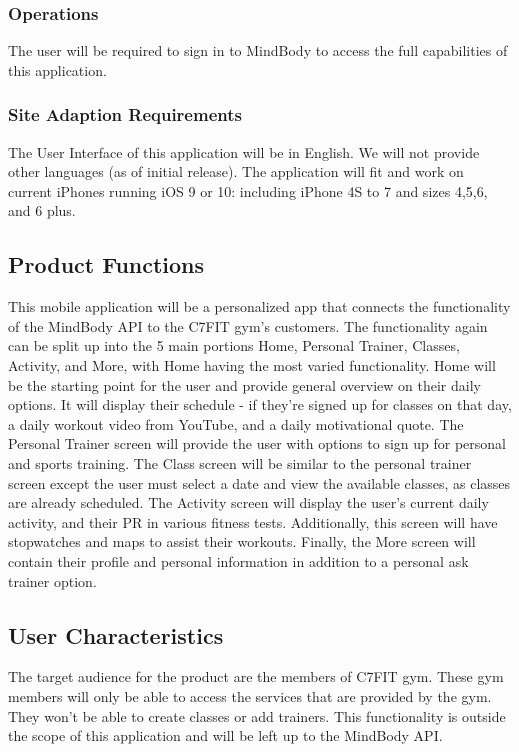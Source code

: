 \documentclass[letterpaper,10pt,titlepage]{article}
\begin{document}
\subsubsection{Operations}

The user will be required to sign in to MindBody to access the full capabilities of this application.

\subsubsection{Site Adaption Requirements}

The User Interface of this application will be in English. We will not provide other languages (as of initial release). The application will fit and work on current iPhones running iOS 9 or 10: including iPhone 4S to 7 and sizes 4,5,6, and 6 plus.

\subsection{Product Functions}

This mobile application will be a personalized app that connects the functionality of the MindBody API to the C7FIT gym’s customers. The functionality again can be split up into the 5 main portions Home, Personal Trainer, Classes, Activity, and More, with Home having the most varied functionality. Home will be the starting point for the user and provide general overview on their daily options. It will display their schedule - if they’re signed up for classes on that day, a daily workout video from YouTube, and a daily motivational quote. The Personal Trainer screen will provide the user with options to sign up for personal and sports training. The Class screen will be similar to the personal trainer screen except the user must select a date and view the available classes, as classes are already scheduled. The Activity screen will display the user’s current daily activity, and their PR in various fitness tests. Additionally, this screen will have stopwatches and maps to assist their workouts. Finally, the More screen will contain their profile and personal information in addition to a personal ask trainer option.

\subsection{User Characteristics}

The target audience for the product are the members of C7FIT gym. These gym members will only be able to access the services that are provided by the gym. They won’t be able to create classes or add trainers. This functionality is outside the scope of this application and will be left up to the MindBody API.
\end{document}
